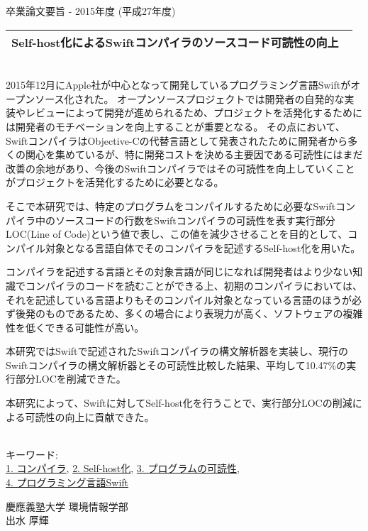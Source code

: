 卒業論文要旨 - 2015年度 (平成27年度)
\begin{center}
\begin{large}
\begin{tabular}{|M{0.97\linewidth}|}
    \hline
    Self-host化によるSwiftコンパイラのソースコード可読性の向上\\
    \hline
\end{tabular}
\end{large}
\end{center}

~ \\

2015年12月にApple社が中心となって開発しているプログラミング言語Swiftがオープンソース化された。
オープンソースプロジェクトでは開発者の自発的な実装やレビューによって開発が進められるため、プロジェクトを活発化するためには開発者のモチベーションを向上することが重要となる。
その点において、SwiftコンパイラはObjective-Cの代替言語として発表されたために開発者から多くの関心を集めているが、特に開発コストを決める主要因である可読性にはまだ改善の余地があり、今後のSwiftコンパイラではその可読性を向上していくことがプロジェクトを活発化するために必要となる。

そこで本研究では、特定のプログラムをコンパイルするために必要なSwiftコンパイラ中のソースコードの行数をSwiftコンパイラの可読性を表す実行部分LOC(Line of Code)という値で表し、この値を減少させることを目的として、コンパイル対象となる言語自体でそのコンパイラを記述するSelf-host化を用いた。

コンパイラを記述する言語とその対象言語が同じになれば開発者はより少ない知識でコンパイラのコードを読むことができる上、初期のコンパイラにおいては、それを記述している言語よりもそのコンパイル対象となっている言語のほうが必ず後発のものであるため、多くの場合により表現力が高く、ソフトウェアの複雑性を低くできる可能性が高い。

本研究ではSwiftで記述されたSwiftコンパイラの構文解析器を実装し、現行のSwiftコンパイラの構文解析器とその可読性比較した結果、平均して10.47\%の実行部分LOCを削減できた。

本研究によって、Swiftに対してSelf-host化を行うことで、実行部分LOCの削減による可読性の向上に貢献できた。

~ \\
キーワード:\\
\underline{1. コンパイラ},
\underline{2. Self-host化},
\underline{3. プログラムの可読性},\\
\underline{4. プログラミング言語Swift}
\begin{flushright}
慶應義塾大学 環境情報学部\\
出水 厚輝
\end{flushright}
